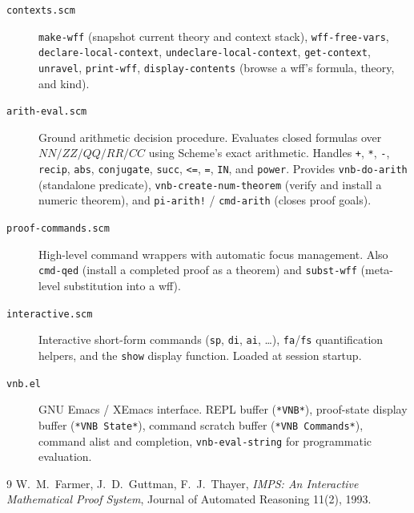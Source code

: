 \documentclass{amsbook}[openany]
\theoremstyle{definition}
\theoremstyle{remark}
\theoremstyle{remark}
\begin{document}
\begin{description}
\item[\texttt{contexts.scm}]
  \texttt{make-wff} (snapshot current theory and context stack),
  \texttt{wff-free-vars}, \texttt{declare-local-context},
  \texttt{undeclare-local-context}, \texttt{get-context},
  \texttt{unravel}, \texttt{print-wff}, \texttt{display-contents}
  (browse a wff's formula, theory, and kind).

\item[\texttt{arith-eval.scm}]
  Ground arithmetic decision procedure.  Evaluates closed formulas over
  $\mathit{NN}/\mathit{ZZ}/\mathit{QQ}/\mathit{RR}/\mathit{CC}$ using
  Scheme's exact arithmetic.  Handles \texttt{+}, \texttt{*},
  \texttt{-}, \texttt{recip}, \texttt{abs}, \texttt{conjugate},
  \texttt{succ}, \texttt{<=}, \texttt{=}, \texttt{IN}, and
  \texttt{power}.  Provides \texttt{vnb-do-arith} (standalone
  predicate), \texttt{vnb-create-num-theorem} (verify and install a
  numeric theorem), and \texttt{pi-arith!} / \texttt{cmd-arith} (closes
  proof goals).

\item[\texttt{proof-commands.scm}]
  High-level command wrappers with automatic focus management.  Also
  \texttt{cmd-qed} (install a completed proof as a theorem) and
  \texttt{subst-wff} (meta-level substitution into a wff).

\item[\texttt{interactive.scm}]
  Interactive short-form commands (\texttt{sp}, \texttt{di},
  \texttt{ai}, \ldots), \texttt{fa}/\texttt{fs} quantification helpers,
  and the \texttt{show} display function.  Loaded at session startup.

\item[\texttt{vnb.el}]
  GNU Emacs / XEmacs interface.  REPL buffer (\texttt{*VNB*}),
  proof-state display buffer (\texttt{*VNB State*}), command scratch
  buffer (\texttt{*VNB Commands*}), command alist and completion,
  \texttt{vnb-eval-string} for programmatic evaluation.

\end{description}


\begin{thebibliography}{9}
W.~M.~Farmer, J.~D.~Guttman, F.~J.~Thayer,
\textit{IMPS: An Interactive Mathematical Proof System},
Journal of Automated Reasoning 11(2), 1993.
\end{thebibliography}
\end{document}
